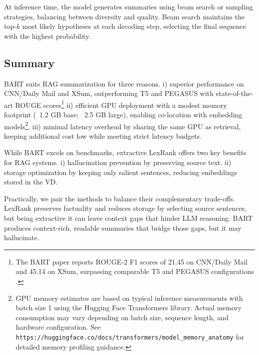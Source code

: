 At inference time, the model generates summaries using beam search or sampling strategies, balancing between diversity and quality. Beam search maintains the top-$k$ most likely hypotheses at each decoding step, selecting the final sequence with the highest probability.

\subsection{Summary}

\gls{BART} suits \gls{RAG} summarization for three reasons. i) superior performance on CNN/Daily Mail and XSum, outperforming T5 and PEGASUS with state-of-the-art ROUGE scores\footnote{The \gls{BART} paper reports ROUGE-2 F1 scores of 21.45 on CNN/Daily Mail and 45.14 on XSum, surpassing comparable T5 and PEGASUS configurations \cite{lewis2019bart}. } ii) efficient GPU deployment with a modest memory footprint (~1.2 GB base; ~2.5 GB large), enabling co-location with embedding models\footnote{GPU memory estimates are based on typical inference measurements with batch size 1 using the Hugging Face Transformers library. Actual memory consumption may vary depending on batch size, sequence length, and hardware configuration. See \texttt{https://huggingface.co/docs/transformers/model\_memory\_anatomy} for detailed memory profiling guidance.}. iii) minimal latency overhead by sharing the same GPU as retrieval, keeping additional cost low while meeting strict latency budgets.


While \gls{BART} excels on benchmarks, extractive LexRank offers two key benefits for \gls{RAG} systems. i) hallucination prevention by preserving source text. ii) storage optimization by keeping only salient sentences, reducing embeddings stored in the \gls{VD}.

Practically, we pair the methods to balance their complementary trade-offs. LexRank preserves factuality and reduces storage by selecting source sentences, but being extractive it can leave context gaps that hinder \gls{LLM} reasoning. \gls{BART} produces context-rich, readable summaries that bridge those gaps, but it may hallucinate. 

